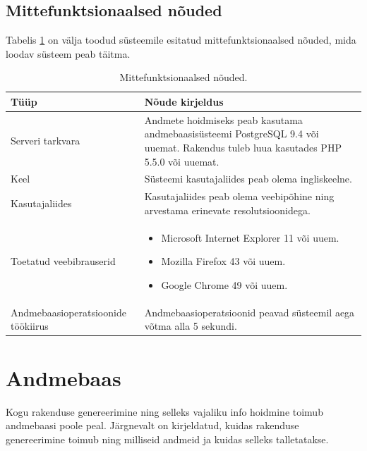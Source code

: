 \documentclass[a4paper,12pt]{article} %
\begin{document}
\subsection{Mittefunktsionaalsed nõuded}
Tabelis \ref{mittefunktsionaalsed_nõuded} on välja toodud süsteemile esitatud mittefunktsionaalsed nõuded, mida loodav süsteem peab täitma.
\begin{table}[H]%
\begin{center}
\caption{Mittefunktsionaalsed nõuded.}
\label{mittefunktsionaalsed_nõuded}
\begin{tabular}{|p{5cm}|p{10cm}|}
\hline
\rowcolor{rowgray}
Tüüp & Nõude kirjeldus \\ \hline
Serveri tarkvara & Andmete hoidmiseks peab kasutama andmebaasisüsteemi PostgreSQL 9.4 või uuemat. Rakendus tuleb luua kasutades PHP 5.5.0 või uuemat. \\ \hline
Keel & Süsteemi kasutajaliides peab olema ingliskeelne. \\ \hline
Kasutajaliides & Kasutajaliides peab olema veebipõhine ning arvestama erinevate resolutsioonidega. \\ \hline
Toetatud veebibrauserid & 
\begin{itemize}
\item Microsoft Internet Explorer 11 või uuem.
\item Mozilla Firefox 43 või uuem.
\item Google Chrome 49 või uuem.
\end{itemize}
 \\ \hline
Andmebaasioperatsioonide töökiirus & Andmebaasioperatsioonid peavad süsteemil aega võtma alla 5 sekundi. \\ \hline
\end{tabular}
\end{center}
\end{table}

\section{Andmebaas}
Kogu rakenduse genereerimine ning selleks vajaliku info hoidmine toimub andmebaasi poole peal. Järgnevalt on kirjeldatud, kuidas rakenduse genereerimine toimub ning milliseid andmeid ja kuidas selleks talletatakse.
\end{document}
